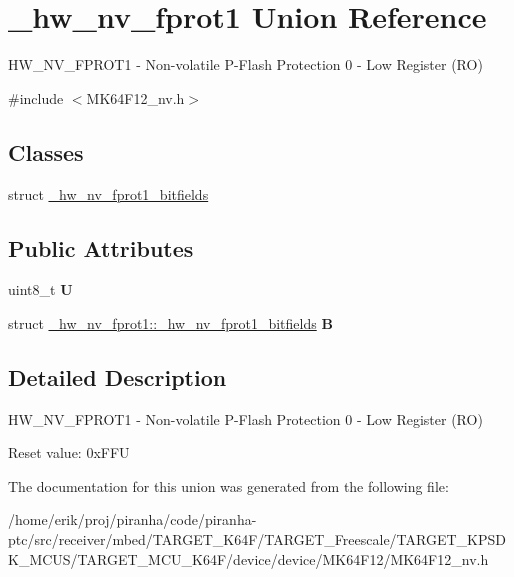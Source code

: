 \hypertarget{union__hw__nv__fprot1}{}\section{\+\_\+hw\+\_\+nv\+\_\+fprot1 Union Reference}
\label{union__hw__nv__fprot1}


H\+W\+\_\+\+N\+V\+\_\+\+F\+P\+R\+O\+T1 -\/ Non-\/volatile P-\/\+Flash Protection 0 -\/ Low Register (RO)  




{\ttfamily \#include $<$M\+K64\+F12\+\_\+nv.\+h$>$}

\subsection*{Classes}
\begin{DoxyCompactItemize}
\item 
struct \hyperlink{struct__hw__nv__fprot1_1_1__hw__nv__fprot1__bitfields}{\+\_\+hw\+\_\+nv\+\_\+fprot1\+\_\+bitfields}
\end{DoxyCompactItemize}
\subsection*{Public Attributes}
\begin{DoxyCompactItemize}
\item 
uint8\+\_\+t {\bfseries U}\hypertarget{union__hw__nv__fprot1_a8b3bf669700ac07c69b62d66451333c3}{}\label{union__hw__nv__fprot1_a8b3bf669700ac07c69b62d66451333c3}

\item 
struct \hyperlink{struct__hw__nv__fprot1_1_1__hw__nv__fprot1__bitfields}{\+\_\+hw\+\_\+nv\+\_\+fprot1\+::\+\_\+hw\+\_\+nv\+\_\+fprot1\+\_\+bitfields} {\bfseries B}\hypertarget{union__hw__nv__fprot1_aaa6e03f4588e964d3f0b9c91b7436e39}{}\label{union__hw__nv__fprot1_aaa6e03f4588e964d3f0b9c91b7436e39}

\end{DoxyCompactItemize}


\subsection{Detailed Description}
H\+W\+\_\+\+N\+V\+\_\+\+F\+P\+R\+O\+T1 -\/ Non-\/volatile P-\/\+Flash Protection 0 -\/ Low Register (RO) 

Reset value\+: 0x\+F\+FU 

The documentation for this union was generated from the following file\+:\begin{DoxyCompactItemize}
\item 
/home/erik/proj/piranha/code/piranha-\/ptc/src/receiver/mbed/\+T\+A\+R\+G\+E\+T\+\_\+\+K64\+F/\+T\+A\+R\+G\+E\+T\+\_\+\+Freescale/\+T\+A\+R\+G\+E\+T\+\_\+\+K\+P\+S\+D\+K\+\_\+\+M\+C\+U\+S/\+T\+A\+R\+G\+E\+T\+\_\+\+M\+C\+U\+\_\+\+K64\+F/device/device/\+M\+K64\+F12/M\+K64\+F12\+\_\+nv.\+h\end{DoxyCompactItemize}
